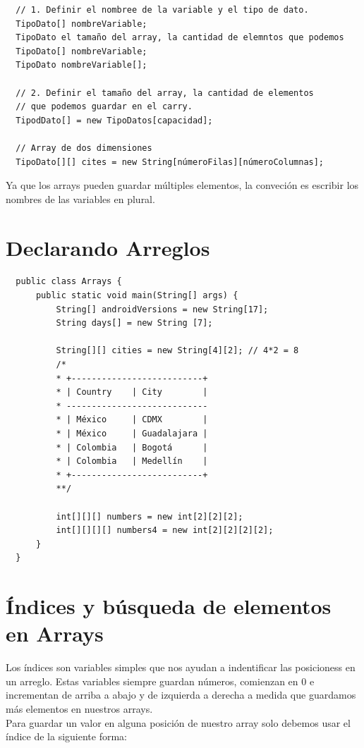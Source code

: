 \documentclass{article}
\begin{document}
\begin{verbatim}
  // 1. Definir el nombree de la variable y el tipo de dato.
  TipoDato[] nombreVariable;
  TipoDato el tamaño del array, la cantidad de elemntos que podemos
  TipoDato[] nombreVariable;
  TipoDato nombreVariable[];

  // 2. Definir el tamaño del array, la cantidad de elementos
  // que podemos guardar en el carry.
  TipodDato[] = new TipoDatos[capacidad];

  // Array de dos dimensiones
  TipoDato[][] cites = new String[númeroFilas][númeroColumnas];
\end{verbatim}

Ya que los arrays pueden guardar múltiples elementos, la conveción es escribir
los nombres de las variables en plural.

\section{Declarando Arreglos}%

\begin{verbatim}
  public class Arrays {
      public static void main(String[] args) {
          String[] androidVersions = new String[17];
          String days[] = new String [7];

          String[][] cities = new String[4][2]; // 4*2 = 8
          /*
          * +--------------------------+
          * | Country    | City        |
          * ----------------------------
          * | México     | CDMX        |
          * | México     | Guadalajara |
          * | Colombia   | Bogotá      |
          * | Colombia   | Medellín    |
          * +--------------------------+
          **/

          int[][][] numbers = new int[2][2][2];
          int[][][][] numbers4 = new int[2][2][2][2];
      }
  }
\end{verbatim}


\section{Índices y búsqueda de elementos en Arrays}%
Los índices son variables simples que nos ayudan a indentificar las posicioness
en un arreglo. Estas variables siempre guardan números, comienzan en 0 e
incrementan de arriba a abajo y de izquierda a derecha a medida que guardamos
más elementos en nuestros arrays.\\

Para guardar un valor en alguna posición de nuestro array solo debemos usar el
índice de la siguiente forma:
\end{document}
